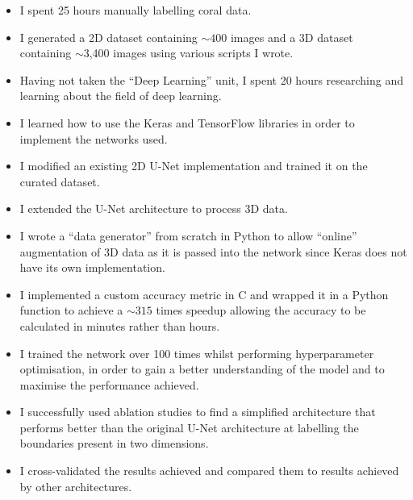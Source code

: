 \begin{itemize}
    \item I spent 25 hours manually labelling coral data.
    \item I generated a 2D dataset containing ${\sim}400$ images and a 3D dataset containing ${\sim}$3,400 images using various scripts I wrote.
    \item Having not taken the ``Deep Learning'' unit, I spent 20 hours researching and learning about the field of deep learning.
    \item I learned how to use the Keras and TensorFlow libraries in order to implement the networks used.
    \item I modified an existing 2D U-Net implementation and trained it on the curated dataset.
    \item I extended the U-Net architecture to process 3D data.
    \item I wrote a ``data generator'' from scratch in Python to allow ``online'' augmentation of 3D data as it is passed into the network since Keras does not have its own implementation.
    \item I implemented a custom accuracy metric in C and wrapped it in a Python function to achieve a ${\sim}315$ times speedup allowing the accuracy to be calculated in minutes rather than hours.
    \item I trained the network over 100 times whilst performing hyperparameter optimisation, in order to gain a better understanding of the model and to maximise the performance achieved.
    \item I successfully used ablation studies to find a simplified architecture that performs better than the original U-Net architecture at labelling the boundaries present in two dimensions.
    \item I cross-validated the results achieved and compared them to results achieved by other architectures.
\end{itemize}